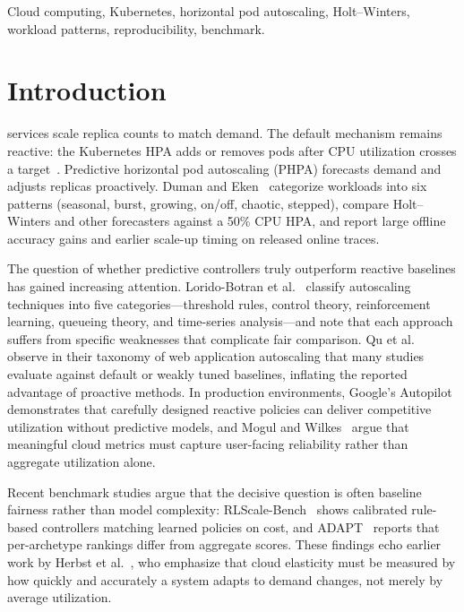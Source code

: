 \documentclass[journal]{IEEEtran}
\begin{document}
\begin{IEEEkeywords}
Cloud computing, Kubernetes, horizontal pod autoscaling, Holt--Winters, workload patterns, reproducibility, benchmark.
\end{IEEEkeywords}

\section{Introduction}
 services scale replica counts to match demand. The default mechanism remains reactive: the Kubernetes HPA adds or removes pods after CPU utilization crosses a target~\cite{nguyen2020,carrion2022}. Predictive horizontal pod autoscaling (PHPA) forecasts demand and adjusts replicas proactively. Duman and Eken~\cite{duman2026} categorize workloads into six patterns (seasonal, burst, growing, on/off, chaotic, stepped), compare Holt--Winters and other forecasters against a 50\% CPU HPA, and report large offline accuracy gains and earlier scale-up timing on released online traces.

The question of whether predictive controllers truly outperform reactive baselines has gained increasing attention. Lorido-Botran et al.~\cite{lorido2014} classify autoscaling techniques into five categories---threshold rules, control theory, reinforcement learning, queueing theory, and time-series analysis---and note that each approach suffers from specific weaknesses that complicate fair comparison. Qu et al.~\cite{qu2018} observe in their taxonomy of web application autoscaling that many studies evaluate against default or weakly tuned baselines, inflating the reported advantage of proactive methods. In production environments, Google's Autopilot~\cite{rzadca2020} demonstrates that carefully designed reactive policies can deliver competitive utilization without predictive models, and Mogul and Wilkes~\cite{mogul2019} argue that meaningful cloud metrics must capture user-facing reliability rather than aggregate utilization alone.

Recent benchmark studies argue that the decisive question is often baseline fairness rather than model complexity: RLScale-Bench~\cite{rlscale2026} shows calibrated rule-based controllers matching learned policies on cost, and ADAPT~\cite{adapt2026} reports that per-archetype rankings differ from aggregate scores. These findings echo earlier work by Herbst et al.~\cite{herbst2013}, who emphasize that cloud elasticity must be measured by how quickly and accurately a system adapts to demand changes, not merely by average utilization.
\end{document}
